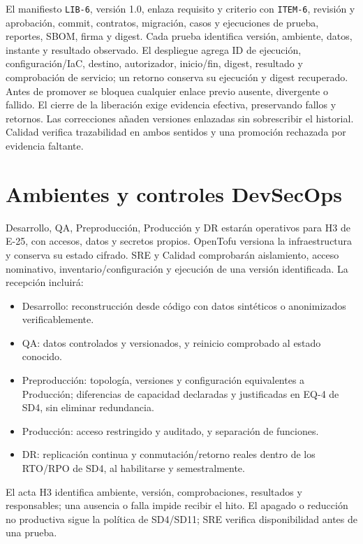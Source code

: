El manifiesto \texttt{LIB-6}, versión 1.0, enlaza requisito y criterio con \texttt{ITEM-6}, revisión y aprobación, commit, contratos, migración, casos y ejecuciones de prueba, reportes, SBOM, firma y digest. Cada prueba identifica versión, ambiente, datos, instante y resultado observado. El despliegue agrega ID de ejecución, configuración/IaC, destino, autorizador, inicio/fin, digest, resultado y comprobación de servicio; un retorno conserva su ejecución y digest recuperado. Antes de promover se bloquea cualquier enlace previo ausente, divergente o fallido. El cierre de la liberación exige evidencia efectiva, preservando fallos y retornos. Las correcciones añaden versiones enlazadas sin sobrescribir el historial. Calidad verifica trazabilidad en ambos sentidos y una promoción rechazada por evidencia faltante.

\section{Ambientes y controles DevSecOps}
Desarrollo, QA, Preproducción, Producción y DR estarán operativos para H3 de E-25, con accesos, datos y secretos propios. OpenTofu versiona la infraestructura y conserva su estado cifrado. SRE y Calidad comprobarán aislamiento, acceso nominativo, inventario/configuración y ejecución de una versión identificada. La recepción incluirá:
\begin{itemize}
\item Desarrollo: reconstrucción desde código con datos sintéticos o anonimizados verificablemente.
\item QA: datos controlados y versionados, y reinicio comprobado al estado conocido.
\item Preproducción: topología, versiones y configuración equivalentes a Producción; diferencias de capacidad declaradas y justificadas en EQ-4 de SD4, sin eliminar redundancia.
\item Producción: acceso restringido y auditado, y separación de funciones.
\item DR: replicación continua y conmutación/retorno reales dentro de los RTO/RPO de SD4, al habilitarse y semestralmente.
\end{itemize}
El acta H3 identifica ambiente, versión, comprobaciones, resultados y responsables; una ausencia o falla impide recibir el hito. El apagado o reducción no productiva sigue la política de SD4/SD11; SRE verifica disponibilidad antes de una prueba. \parencites[RT-04.01/02/13, pp.~10--11; RT-11.25, p.~24]{sd6-bt}[PO.5, tabla~1]{sd6-ssdf}

